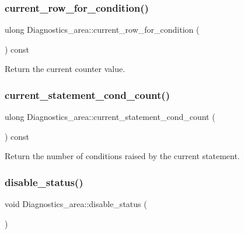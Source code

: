 \subsubsection{\texorpdfstring{current\+\_\+row\+\_\+for\+\_\+condition()}{current\_row\_for\_condition()}}
{\footnotesize\ttfamily ulong Diagnostics\+\_\+area\+::current\+\_\+row\+\_\+for\+\_\+condition (\begin{DoxyParamCaption}{ }\end{DoxyParamCaption}) const\hspace{0.3cm}{\ttfamily [inline]}}

Return the current counter value. \mbox{\label{classDiagnostics__area_a76c5d8c11b00ca7655e2c8962e0327eb}} 
\subsubsection{\texorpdfstring{current\+\_\+statement\+\_\+cond\+\_\+count()}{current\_statement\_cond\_count()}}
{\footnotesize\ttfamily ulong Diagnostics\+\_\+area\+::current\+\_\+statement\+\_\+cond\+\_\+count (\begin{DoxyParamCaption}{ }\end{DoxyParamCaption}) const\hspace{0.3cm}{\ttfamily [inline]}}

Return the number of conditions raised by the current statement. \mbox{\label{classDiagnostics__area_a3ca17737803af475b84ff53f1409adf2}} 
\subsubsection{\texorpdfstring{disable\+\_\+status()}{disable\_status()}}
{\footnotesize\ttfamily void Diagnostics\+\_\+area\+::disable\+\_\+status (\begin{DoxyParamCaption}{ }\end{DoxyParamCaption})\hspace{0.3cm}{\ttfamily [inline]}}

